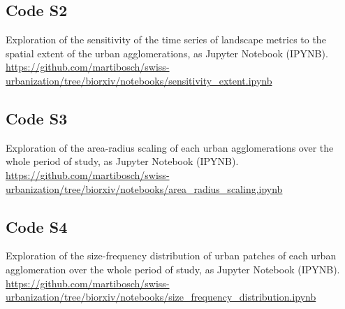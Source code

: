 \subsection*{Code S2}
\label{code-sensitivity-extent}
Exploration of the sensitivity of the time series of landscape metrics to the spatial extent of the urban agglomerations, as Jupyter Notebook (IPYNB).
\url{https://github.com/martibosch/swiss-urbanization/tree/biorxiv/notebooks/sensitivity_extent.ipynb}

\subsection*{Code S3}
\label{code-area-radius-scaling}
Exploration of the area-radius scaling of each urban agglomerations over the whole period of study, as Jupyter Notebook (IPYNB).
\url{https://github.com/martibosch/swiss-urbanization/tree/biorxiv/notebooks/area_radius_scaling.ipynb}

\subsection*{Code S4}
\label{code-size-frequency-distribution}
Exploration of the size-frequency distribution of urban patches of each urban agglomeration over the whole period of study, as Jupyter Notebook (IPYNB).
\url{https://github.com/martibosch/swiss-urbanization/tree/biorxiv/notebooks/size_frequency_distribution.ipynb}







